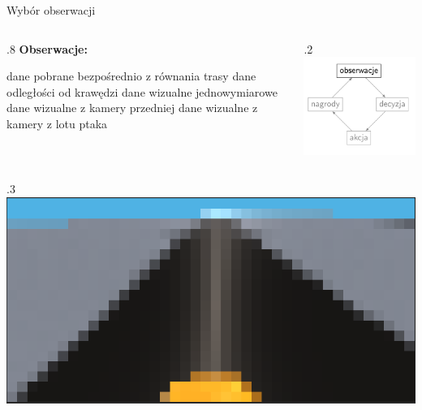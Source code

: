 \begin{frame}{Wybór obserwacji}
	
	\begin{columns}
		\begin{column}{.8\hsize}
			\textbf{Obserwacje:}
			\begin{itemize}
				\myitem dane pobrane bezpośrednio z równania trasy
				\myitem dane odległości od krawędzi
				\myitem dane wizualne jednowymiarowe
				\myitem dane wizualne z kamery przedniej
				\myitem dane wizualne z kamery z lotu ptaka
			\end{itemize}
			\vspace{5mm}
		\end{column}
		
		\begin{column}{.2\hsize}
			\includegraphics[width=\linewidth]{figures/learning_loop_1.png}
			\vspace{15mm}
		\end{column}
	\end{columns}

	\begin{columns}
		\begin{column}{.3\hsize}
			\hspace*{3.9cm}
			\includegraphics[width=\linewidth]{figures/observations_2.png}
		\end{column}
	\end{columns}


\end{frame}
